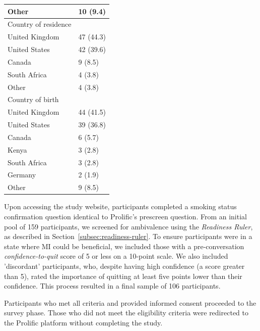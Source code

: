 \begin{table}[htbp]
\begin{tabular}{l l}
\quad Other & 10 (9.4) \\
\hline
Country of residence & \\
\quad United Kingdom & 47 (44.3) \\
\quad United States & 42 (39.6) \\
\quad Canada & 9 (8.5) \\
\quad South Africa & 4 (3.8) \\
\quad Other & 4 (3.8) \\
\hline
Country of birth & \\
\quad United Kingdom & 44 (41.5) \\
\quad United States & 39 (36.8) \\
\quad Canada & 6 (5.7) \\
\quad Kenya & 3 (2.8) \\
\quad South Africa & 3 (2.8) \\
\quad Germany & 2 (1.9) \\
\quad Other & 9 (8.5) \\
\hline
\end{tabular}
\label{tab:participant-characteristics}
\end{table}


Upon accessing the study website, participants completed a smoking status confirmation question identical to Prolific's prescreen question. From an initial pool of 159 participants, we screened for ambivalence using the \textit{Readiness Ruler}, as described in Section~\ref{subsec:readiness-ruler}. To ensure participants were in a state where MI could be beneficial, we included those with a pre-conversation \emph{confidence-to-quit} score of 5 or less on a 10-point scale. We also included 'discordant'
participants, who, despite having high confidence (a score greater than 5), rated the importance of quitting at least five points lower than their confidence. This process resulted in a final sample of 106 participants.


Participants who met all criteria and provided informed consent proceeded to the survey phase. Those who did not meet the eligibility criteria were redirected to the Prolific platform without completing the study.


